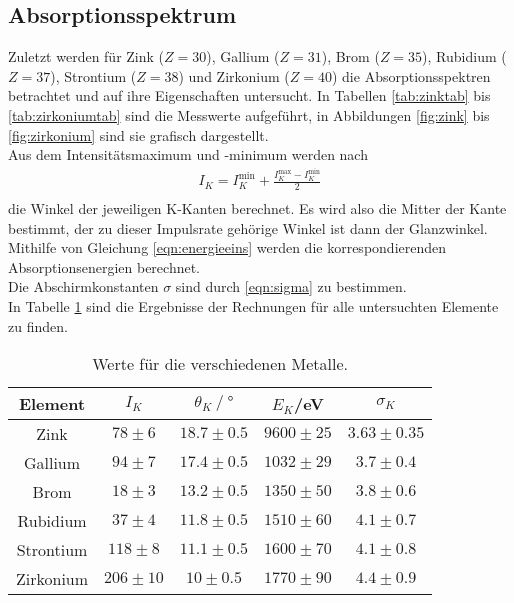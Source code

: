 \subsection{Absorptionsspektrum}
  Zuletzt werden für Zink ($Z = 30$), Gallium ($Z = 31$), Brom ($Z = 35$), Rubidium ($Z = 37$), Strontium ($Z = 38$) und Zirkonium ($Z = 40$) die Absorptionsspektren betrachtet und auf ihre
  Eigenschaften untersucht. In Tabellen \ref{tab:zinktab} bis \ref{tab:zirkoniumtab} sind die Messwerte aufgeführt, in 
  Abbildungen \ref{fig:zink} bis \ref{fig:zirkonium} sind sie grafisch dargestellt.\\
  Aus dem Intensitätsmaximum und -minimum werden nach
  \begin{align}
    I_K = I_K^{\text{min}} + \frac{I_K^{\text{max}} - I_K^{\text{min}}}{2}\\
    \label{eqn:intens}
  \end{align}
  die Winkel der jeweiligen K-Kanten berechnet. Es wird also die Mitter der Kante bestimmt, der zu dieser Impulsrate gehörige 
  Winkel ist dann der Glanzwinkel.\\
  Mithilfe von Gleichung \eqref{eqn:energieeins}
  werden die korrespondierenden Absorptionsenergien berechnet. \\
  Die Abschirmkonstanten $\sigma$ sind durch \eqref{eqn:sigma}
  zu bestimmen.\\
  In Tabelle \ref{tab:results} sind die Ergebnisse der Rechnungen für alle untersuchten Elemente zu finden.

  \begin{table}
    \centering
    \caption{Werte für die verschiedenen Metalle.}
    \label{tab:results}
    \begin{tabular}{c c c c c}
      \toprule
      Element & $I_K$ & $\theta_K \mathbin{/}°$ & $E_K$/eV& $\sigma_K$ \\
      \midrule
      Zink & $78 \pm 6$ & $18.7 \pm 0.5$ & $9600 \pm 25$ & $3.63 \pm 0.35$ \\
      Gallium & $94 \pm 7$ & $17.4 \pm 0.5$& $1032 \pm 29$ & $3.7 \pm 0.4$ \\
      Brom & $18 \pm 3$ & $13.2 \pm 0.5$ & $1350 \pm 50$ & $3.8 \pm 0.6$ \\
      Rubidium & $37 \pm 4$ & $11.8 \pm 0.5$ & $1510 \pm 60$  & $4.1 \pm 0.7$ \\
      Strontium & $118 \pm 8$ & $11.1 \pm 0.5$ & $1600 \pm 70$ & $4.1 \pm 0.8$ \\
      Zirkonium & $206 \pm 10$ & $10 \pm 0.5$  & $1770 \pm 90$ & $4.4 \pm 0.9$ \\
      \bottomrule
    \end{tabular}
  \end{table}
  \FloatBarrier

